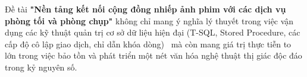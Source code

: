 Đề tài \textbf{"Nền tảng kết nối cộng đồng nhiếp ảnh phim với các dịch vụ phòng tối và phòng chụp"} không chỉ mang ý nghĩa lý thuyết trong việc vận dụng các kỹ thuật quản trị cơ sở dữ liệu hiện đại (T-SQL, Stored Procedure, các cấp độ cô lập giao dịch, chỉ dẫn khóa dòng)~\cite{silberschatz2020database, microsoft2024locking} mà còn mang giá trị thực tiễn to lớn trong việc bảo tồn và phát triển một nét văn hóa nghệ thuật thị giác độc đáo trong kỷ nguyên số.
